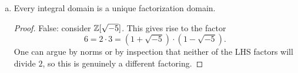 \begin{itemize}
\begin{enumerate}[(a)]
    \item Every integral domain is a unique factorization domain.
    \begin{proof}
    False: consider $\mathbb{Z}[\sqrt{-5}]$. This gives rise to the factor 
    $$6 = 2 \cdot 3 = (1 + \sqrt{-5}) \cdot (1 - \sqrt{-5}).$$
    One can argue by norms or by inspection that neither of the LHS factors will divide $2$, so this is genuinely a different factoring.
    \end{proof}
\end{enumerate}





















\end{itemize}